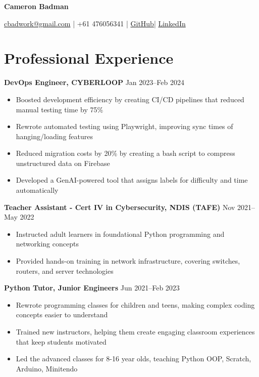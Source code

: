\documentclass[10pt,a4paper]{article}
\begin{document}
	\begin{center}
		{\huge\textbf{Cameron Badman}}
		\begin{center}
		\href{mailto:cbadwork@gmail.com}{cbadwork@gmail.com} |
		+61 476056341 |
		\href{https://github.com/CameronBadman}{GitHub}| 
		\href{https://www.linkedin.com/in/cameron-badman-5314ba1b8/}{LinkedIn}
		\end{center}
	\end{center}
	
	\section{Professional Experience}
	\textbf{DevOps Engineer, CYBERLOOP} \hfill Jan 2023--Feb 2024 
	\begin{itemize}[label=\textbullet, itemsep=0.05cm]
		\item Boosted development efficiency by creating CI/CD pipelines that reduced manual testing time by 75\%
		\item Rewrote automated testing using Playwright, improving sync times of hanging/loading features 
		\item Reduced migration costs by 20\% by creating a bash script to compress unstructured data on Firebase
		\item Developed a GenAI-powered tool that assigns labels for difficulty and time automatically
	\end{itemize}
	\vspace{0.1cm}
	
	\textbf{Teacher Assistant - Cert IV in Cybersecurity, NDIS (TAFE)} \hfill Nov 2021--May 2022 
	\begin{itemize}[label=\textbullet, itemsep=0.05cm]
		\item Instructed adult learners in foundational Python programming and networking concepts
		\item Provided hands-on training in network infrastructure, covering switches, routers, and server technologies
	\end{itemize}
	\vspace{0.1cm}
	
	\textbf{Python Tutor, Junior Engineers} \hfill Jun 2021--Feb 2023 
	\begin{itemize}[label=\textbullet, itemsep=0.05cm]
		\item Rewrote programming classes for children and teens, making complex coding concepts easier to understand
		\item Trained new instructors, helping them create engaging classroom experiences that keep students motivated
		\item Led the advanced classes for 8-16 year olds, teaching Python OOP, Scratch, Arduino, Minitendo
	\end{itemize}
	\vspace{0.1cm}
	
\end{document}
